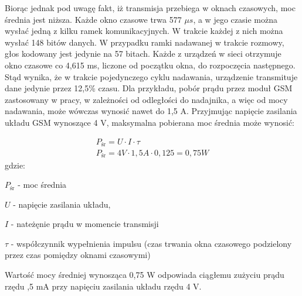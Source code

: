 Biorąc jednak pod uwagę fakt, iż transmisja przebiega w oknach czasowych, moc średnia jest niższa. Każde okno czasowe trwa 577 $\mu s$, a w jego czasie można wysłać jedną z kilku ramek komunikacyjnych. W trakcie każdej z nich można wysłać 148 bitów danych. W przypadku ramki nadawanej w trakcie rozmowy, głos kodowany jest jedynie na 57 bitach. Każde z urządzeń w sieci otrzymuje okno czasowe co 4,615 ms, liczone od początku okna, do rozpoczęcia następnego. Stąd wynika, że w trakcie pojedynczego cyklu nadawania, urządzenie transmituje dane jedynie przez 12,5\% czasu. Dla przykładu, pobór prądu przez moduł GSM zastosowany w pracy, w zależności od odległości do nadajnika, a więc od mocy nadawania, może wówczas wynosić nawet do 1,5 A. Przyjmując napięcie zasilania układu GSM wynoszące 4 V, maksymalna pobierana moc średnia może wynosić:

\begin{gather}
 	P_{\text{śr}} = U \cdot I \cdot \tau \\
 	P_{\text{śr}} = 4 V \cdot 1,5 A \cdot 0,125 = 0,75 W \nonumber 	
 	\label{eq_gsm_power_mean} 
\end{gather}
 gdzie:
 
 $P_{\text{śr}} $ - moc średnia
 
 $U$ - napięcie zasilania układu,
 
 $I$ - nateżęnie prądu w momencie transmisji
 
 $\tau$ - współczynnik wypełnienia impulsu (czas trwania okna czasowego podzielony przez czas pomiędzy oknami czasowymi)
 
Wartość mocy średniej wynosząca 0,75 W odpowiada ciągłemu zużyciu prądu rzędu ,5 mA przy napięciu zasilania układu rzędu 4 V. 


